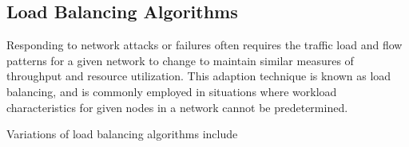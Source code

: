 \documentclass[11pt]{article}
\begin{document}

\subsection{Load Balancing Algorithms}

Responding to network attacks or failures often requires the traffic load and flow patterns for a given network to change to maintain similar measures of throughput and resource utilization. This adaption technique is known as load balancing, and is commonly employed in situations where workload characteristics for given nodes in a network cannot be predetermined. 

Variations of load balancing algorithms include 




\end{document}
